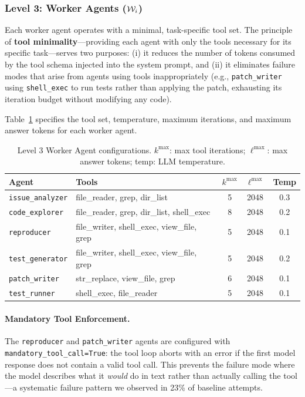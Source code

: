 \subsubsection{Level 3: Worker Agents ($\mathcal{W}_i$)}

Each worker agent operates with a minimal, task-specific tool set. The
principle of \textbf{tool minimality}---providing each agent with only the
tools necessary for its specific task---serves two purposes: (i) it reduces
the number of tokens consumed by the tool schema injected into the system
prompt, and (ii) it eliminates failure modes that arise from agents using
tools inappropriately (e.g., \texttt{patch\_writer} using
\texttt{shell\_exec} to run tests rather than applying the patch, exhausting
its iteration budget without modifying any code).

Table~\ref{tab:workers} specifies the tool set, temperature, maximum
iterations, and maximum answer tokens for each worker agent.

\begin{table}[t]
\centering
\caption{Level 3 Worker Agent configurations. $k^{\max}$: max tool
iterations; $\ell^{\max}$: max answer tokens; temp: LLM temperature.}
\label{tab:workers}
\small
\begin{tabular}{llccc}
\toprule
\textbf{Agent} & \textbf{Tools} & $k^{\max}$ & $\ell^{\max}$ & \textbf{Temp} \\
\midrule
\texttt{issue\_analyzer}  & file\_reader, grep, dir\_list & 5  & 2048 & 0.3 \\
\texttt{code\_explorer}   & file\_reader, grep, dir\_list, shell\_exec & 8  & 2048 & 0.2 \\
\texttt{reproducer}       & file\_writer, shell\_exec, view\_file, grep & 5  & 2048 & 0.1 \\
\texttt{test\_generator}  & file\_writer, shell\_exec, view\_file, grep & 5  & 2048 & 0.2 \\
\texttt{patch\_writer}    & str\_replace, view\_file, grep & 6  & 2048 & 0.1 \\
\texttt{test\_runner}     & shell\_exec, file\_reader & 5  & 2048 & 0.1 \\
\bottomrule
\end{tabular}
\end{table}

\paragraph{Mandatory Tool Enforcement.}
The \texttt{reproducer} and \texttt{patch\_writer} agents are configured
with \texttt{mandatory\_tool\_call=True}: the tool loop aborts with an
error if the first model response does not contain a valid tool call.
This prevents the failure mode where the model describes what it \emph{would}
do in text rather than actually calling the tool---a systematic failure
pattern we observed in 23\% of baseline attempts.

